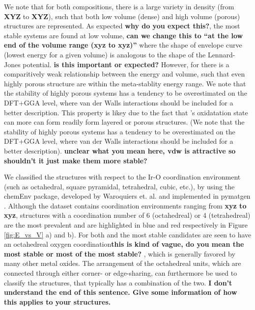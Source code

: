 We note that for both compositions,
there is a large variety in density (from \textbf{XYZ} to \textbf{XYZ}),
such that both low volume (dense) and high volume (porous) structures are represented.
%
As expected \textbf{why do you expect this?}, the most stable systems are found at low volume, \textbf{can we change this to ``at the low end of the volume range (xyz to xyz)''}
where the shape of envelope curve (lowest energy for a given volume) is analogous to the shape of the Lennard-Jones potential. \textbf{is this important or expected?}
%
However, for \IrOthree there is a comparitively weak relationship between the energy and volume,
such that even highly porous structure are within the meta-stablity energy range.
%
We note that the stability of highly porous systems has a tendency to be overestimated on the DFT+GGA level, where van der Walls interactions should be included for a better description.
%
This property is likey due to the fact that \IrOthree's oxidatation state can more can form readily form layered or porous structures.
%
(We note that the stability of highly porous systems has a tendency to be overestimated on the DFT+GGA level, where van der Walls interactions should be included for a better description). \textbf{unclear what you mean here, vdw is attractive so shouldn't it just make them more stable?}



We classified the structures with respect to the Ir-O coordination environment (such as octahedral, square pyramidal, tetrahedral, cubic, etc.), by using the chemEnv package, developed by Waroquiers et. al. \cite{Waroquiers2017} and implemented in pymatgen \cite{Ong2013}. Although the dataset contains  coordination environments ranging from \textbf{xyz to xyz}, structures with a coordination number of 6 (octahedreal) or 4 (tetrahedreal) are the most prevalent and are highlighted in blue and red respectively in Figure \ref{fig:E_vs_V} a) and b). For both \IrOtwo and \IrOthree the most stable candidates are seen to have an octahedreal oxygen coordination\textbf{this is kind of vague, do you mean the most stable or most of the most stable?} , which is generally favored by many other metal oxides. \cite{Waroquiers2017} The arrangement of the octahedreal units, which are connected through either corner- or edge-sharing, can furthermore be used to classify the structures, that typically has a combination of the two. \textbf{I don't understand the end of this sentence.  Give some information of how this applies to your structures.}

